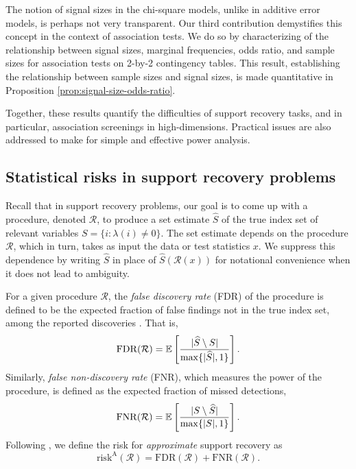 The notion of signal sizes in the chi-square models, unlike in additive error models, is perhaps not very transparent.
Our third contribution demystifies this concept in the context of association tests.
We do so by characterizing of the relationship between signal sizes, marginal frequencies, odds ratio, and sample sizes for association tests on 2-by-2 contingency tables.
This result, establishing the relationship between sample sizes and signal sizes, is made quantitative in Proposition \ref{prop:signal-size-odds-ratio}.

Together, these results quantify the difficulties of support recovery tasks, and in particular, association screenings in high-dimensions.
Practical issues are also addressed to make for simple and effective power analysis.


\subsection{Statistical risks in support recovery problems}
\label{subsec:risks}

Recall that in support recovery problems, our goal is to come up with a procedure, denoted $\mathcal R$, to produce a set estimate $\widehat{S}$ of the true index set of relevant variables  $S=\{i:\lambda(i)\neq 0\}$.
The set estimate depends on the procedure $\mathcal{R}$, which in turn, takes as input the data or test statistics $x$.
We suppress this dependence by writing $\widehat{S}$ in place of $\widehat{S}(\mathcal{R}(x))$ for notational convenience when it does not lead to ambiguity.

For a given procedure $\mathcal{R}$, the \emph{false discovery rate} (FDR) of the procedure is defined to be the expected fraction of false findings not in the true index set, among the reported discoveries \cite{benjamini1995controlling}. That is,
\begin{equation} \label{eq:FDR}
    \mathrm{FDR}(\mathcal{R}) = \E\left[\frac{|\widehat{S}\setminus S|}{\max\{|\widehat{S}|,1\}}\right].
\end{equation}
Similarly, \emph{false non-discovery rate} (FNR), which measures the power of the procedure, is defined as the expected fraction of missed detections,
\begin{equation} \label{eq:FNR}
    \mathrm{FNR}(\mathcal{R}) = \E\left[\frac{|S\setminus \widehat{S}|}{\max\{|{S}|,1\}}\right].
\end{equation}
Following \cite{arias2017distribution, rabinovich2017optimal}, we define the risk for \emph{approximate} support recovery as
\begin{equation} \label{eq:risk-approximate}
    \mathrm{risk}^{\mathrm{A}}(\mathcal{R}) = \mathrm{FDR}(\mathcal{R}) + \mathrm{FNR}(\mathcal{R}).
\end{equation}

